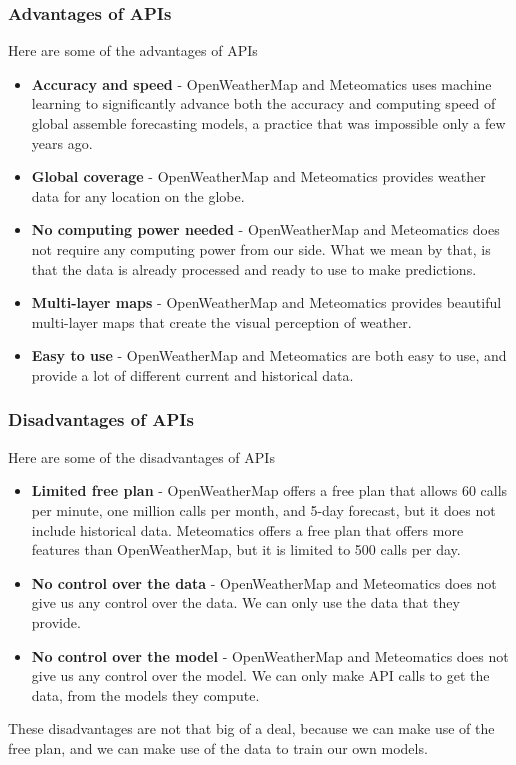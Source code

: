 \documentclass[../paper.tex]{subfiles}
\begin{document}
    \subsubsection{Advantages of APIs}
    Here are some of the advantages of APIs
    \begin{itemize}
        \item \textbf{Accuracy and speed} - OpenWeatherMap and Meteomatics uses machine learning to significantly advance both the accuracy and computing speed of global assemble forecasting models, a practice that was impossible only a few years ago.
        \item \textbf{Global coverage} - OpenWeatherMap and Meteomatics provides weather data for any location on the globe.
        \item \textbf{No computing power needed} - OpenWeatherMap and Meteomatics does not require any computing power from our side.
        What we mean by that, is that the data is already processed and ready to use to make predictions.
        \item \textbf{Multi-layer maps} - OpenWeatherMap and Meteomatics provides beautiful multi-layer maps that create the visual perception of weather.
        \item \textbf{Easy to use} - OpenWeatherMap and Meteomatics are both easy to use, and provide a lot of different current and historical data.
    \end{itemize}

    \subsubsection{Disadvantages of APIs}
    Here are some of the disadvantages of APIs
    \begin{itemize}
        \item \textbf{Limited free plan} - OpenWeatherMap offers a free plan that allows 60 calls per minute, one million calls per month, and 5-day forecast, but it does not include historical data.
        Meteomatics offers a free plan that offers more features than OpenWeatherMap, but it is limited to 500 calls per day.
        \item \textbf{No control over the data} - OpenWeatherMap and Meteomatics does not give us any control over the data.
        We can only use the data that they provide.
        \item \textbf{No control over the model} - OpenWeatherMap and Meteomatics does not give us any control over the model.
        We can only make API calls to get the data, from the models they compute.
    \end{itemize}
    These disadvantages are not that big of a deal, because we can make use of the free plan, and we can make use of the data to train our own models.
\end{document}
